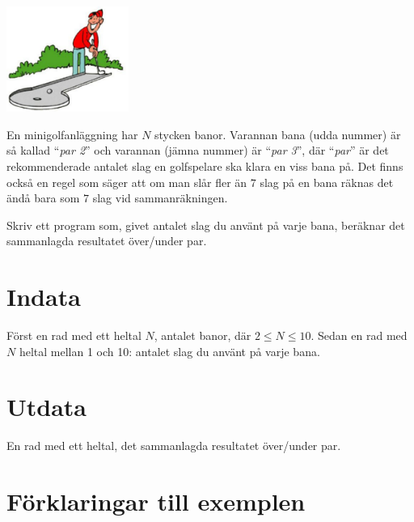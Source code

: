 
\begin{center}
\includegraphics[width=0.3\textwidth]{minigolfbild.pdf}
\end{center}

En minigolfanläggning har $N$ stycken banor. Varannan bana (udda nummer) är så kallad ``{\em par 2}'' och
varannan (jämna nummer) är ``{\em par 3}'', där ``{\em par}'' är det rekommenderade antalet slag en golfspelare ska klara
en viss bana på. Det finns också en regel som säger att om man slår fler än $7$ slag på en bana räknas det ändå
bara som $7$ slag vid sammanräkningen.

Skriv ett program som, givet antalet slag du använt på varje bana, beräknar det sammanlagda resultatet över/under par. 

\section*{Indata}
Först en rad med ett heltal $N$, antalet banor, där $2\le N\le 10$. Sedan en rad med $N$ heltal mellan 1 och 10: antalet slag du använt på varje bana.

\section*{Utdata}
En rad med ett heltal, det sammanlagda resultatet över/under par.

\section*{Förklaringar till exemplen}

